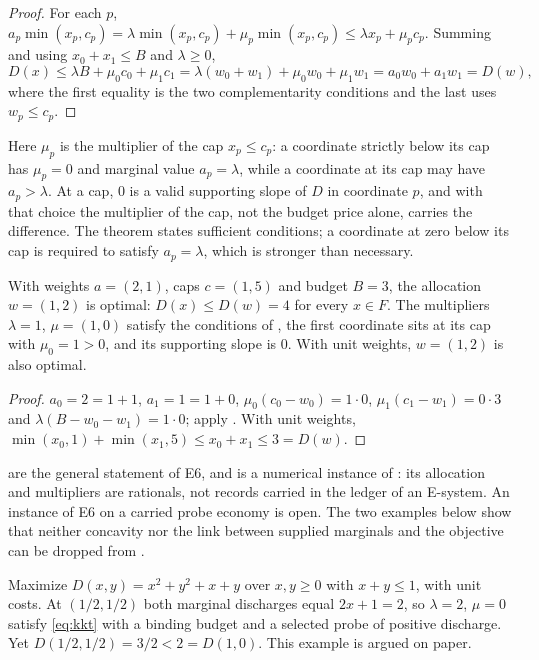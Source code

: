 \begin{proof}
For each $p$, $a_p \min(x_p, c_p) = \lambda \min(x_p, c_p) + \mu_p \min(x_p, c_p) \le \lambda x_p +
\mu_p c_p$. Summing and using $x_0 + x_1 \le B$ and $\lambda \ge 0$,
\[
  D(x) \le \lambda B + \mu_0 c_0 + \mu_1 c_1 = \lambda (w_0 + w_1) + \mu_0 w_0 + \mu_1 w_1
  = a_0 w_0 + a_1 w_1 = D(w),
\]
where the first equality is the two complementarity conditions and the last uses $w_p \le c_p$.
\end{proof}

Here $\mu_p$ is the multiplier of the cap $x_p \le c_p$: a coordinate strictly below its cap has
$\mu_p = 0$ and marginal value $a_p = \lambda$, while a coordinate at its cap may have
$a_p > \lambda$. At a cap, $0$ is a valid supporting slope of $D$ in coordinate $p$, and with that choice the
multiplier of the cap, not the budget price alone, carries the difference. The theorem
states sufficient conditions; a coordinate at zero below its cap is required to satisfy
$a_p = \lambda$, which is stronger than necessary.

\begin{theorem}\label{thm:e6-atcap}
With weights $a = (2, 1)$, caps $c = (1, 5)$ and budget $B = 3$, the allocation $w = (1, 2)$ is
optimal: $D(x) \le D(w) = 4$ for every $x \in F$. The multipliers $\lambda = 1$, $\mu = (1, 0)$
satisfy the conditions of , the first coordinate sits at its cap with
$\mu_0 = 1 > 0$, and its supporting slope is $0$. With unit weights, $w = (1, 2)$ is also optimal.
\end{theorem}

\begin{proof}
$a_0 = 2 = 1 + 1$, $a_1 = 1 = 1 + 0$, $\mu_0(c_0 - w_0) = 1 \cdot 0$, $\mu_1(c_1 - w_1) = 0 \cdot 3$
and $\lambda(B - w_0 - w_1) = 1 \cdot 0$; apply . With unit weights,
$\min(x_0, 1) + \min(x_1, 5) \le x_0 + x_1 \le 3 = D(w)$.
\end{proof}

 are the general statement of E6, and
 is a numerical instance of : its allocation and multipliers are
rationals, not records carried in the ledger of an E-system. An instance of E6 on a carried probe
economy is open. The two examples below show that neither concavity nor the link
between supplied marginals and the objective can be dropped from .

\begin{example}\label{ex:e6-nonconcave}
Maximize $D(x, y) = x^2 + y^2 + x + y$ over $x, y \ge 0$ with $x + y \le 1$, with unit costs. At
$(1/2, 1/2)$ both marginal discharges equal $2x + 1 = 2$, so $\lambda = 2$, $\mu = 0$ satisfy
\eqref{eq:kkt} with a binding budget and a selected probe of positive discharge. Yet
$D(1/2, 1/2) = 3/2 < 2 = D(1, 0)$. This example is argued on paper.
\end{example}

